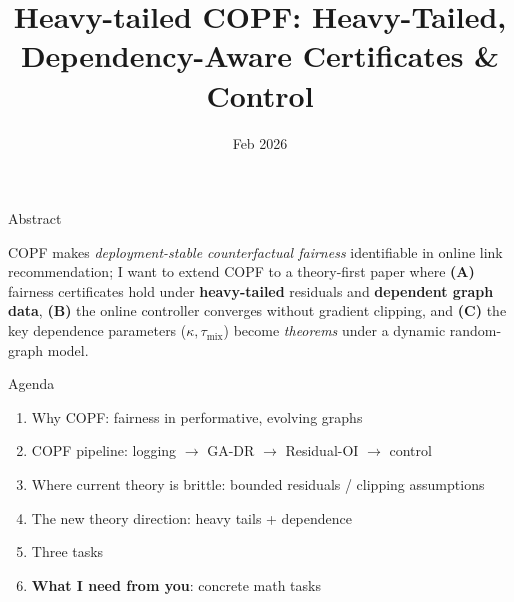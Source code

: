 \documentclass[aspectratio=169,11pt]{beamer}
\title[Heavy-tailed COPF]{Heavy-tailed COPF: Heavy-Tailed, Dependency-Aware Certificates \& Control}
\date{Feb 2026}
\newcommand{\1}{\mathbbm{1}}
\begin{document}
\begin{frame}
  \titlepage
  \vspace{-1.0em}

\end{frame}

\begin{frame}{Abstract}

    \small COPF makes \emph{deployment-stable counterfactual fairness} identifiable in online link recommendation; \newline
    I want to extend COPF to a theory-first paper where \textbf{(A)} fairness certificates hold under \textbf{heavy-tailed} residuals and \textbf{dependent graph data}, \textbf{(B)} the online controller converges without gradient clipping, and \textbf{(C)} the key dependence parameters (\(\kappa,\tau_{\mathrm{mix}}\)) become \emph{theorems} under a dynamic random-graph model.

\end{frame}

\begin{frame}{Agenda}
\begin{enumerate}
  \item Why COPF: fairness in performative, evolving graphs
  \item COPF pipeline: logging \(\to\) GA-DR \(\to\) Residual-OI \(\to\) control
  \item Where current theory is brittle: bounded residuals / clipping assumptions
  \item The new theory direction: heavy tails + dependence
  \item Three tasks
  \item \textbf{What I need from you}: concrete math tasks
\end{enumerate}
\end{frame}
\end{document}
